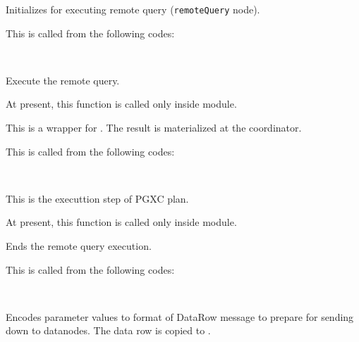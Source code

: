       Initializes for executing remote query (\texttt{remoteQuery} node).
      
      This is called from the following codes:
      
      \FuncRefHdr
		  \\ \hline
      \FuncRefTrailor
  
  
      Execute the remote query.
      
      At present, this function is called only inside  module.
      
      
      This is a wrapper for .
      The result is materialized at the coordinator.
      
      This is called from the following codes:
      
      \FuncRefHdr
      \\ \hline
      \FuncRefTrailor
  
  
      This is the executtion step of PGXC plan.
      
      At present, this function is called only inside  module.
  
  
      Ends the remote query execution.
      
      This is called from the following codes:
      
      \FuncRefHdr
		  \\ \hline
      \FuncRefTrailor
  
  
      Encodes parameter values to format of DataRow message to prepare for
      sending down to datanodes.
      The data row is copied to .
      
